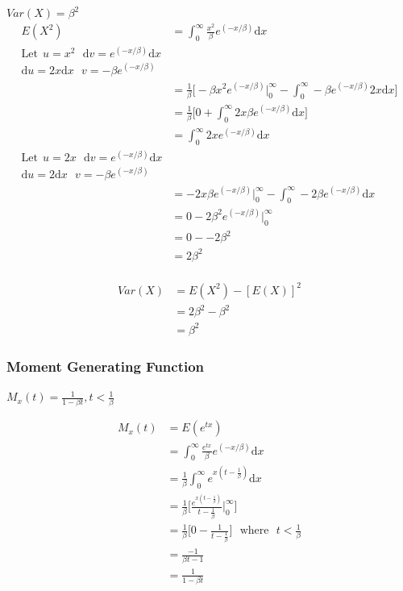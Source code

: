 \documentclass{article}
\begin{document}
$Var(X) = \beta^2$
\begin{align*}
E(X^2) &=  \int_0^\infty \frac{x^2}{\beta}e^{(-x/\beta)} \mathrm{d}x \\
\textrm{Let}\:\: u=x^2   \:\:\:    \mathrm{d}v = e^{(-x/\beta)} \mathrm{d}x \\
 \mathrm{d}u =  2x\mathrm{d}x       \:\:\:        v= - \beta  e^{(-x/\beta)}\\ 
&= \frac{1}{\beta}\bigg[ -\beta x^2  e^{(-x/\beta)} \bigg\vert_0^\infty - \int_0^\infty -\beta  e^{(-x/\beta)} 2x\mathrm{d}x\bigg] \\
&=  \frac{1}{\beta}\bigg[0 + \int_0^\infty 2x \beta e^{(-x/\beta)}\mathrm{d}x\bigg] \\
&=   \int_0^\infty 2x e^{(-x/\beta)}\mathrm{d}x \\
\textrm{Let}\:\: u=2x   \:\:\:    \mathrm{d}v = e^{(-x/\beta)} \mathrm{d}x \\
 \mathrm{d}u =  2\mathrm{d}x       \:\:\:        v= - \beta  e^{(-x/\beta)}\\ 
&= -2x\beta e^{(-x/\beta)}\bigg\vert_0^\infty - \int_0^\infty -2 \beta  e^{(-x/\beta)} \mathrm{d}x \\
&= 0 - 2 \beta^2  e^{(-x/\beta)} \bigg\vert_0^\infty \\
&= 0 - - 2 \beta^2 \\
&=2\beta^2 
\end{align*}\\

\begin{align*}
Var(X) &= E(X^2) - [E(X)]^2\\
&=2\beta^2 - \beta^2\\
&=\beta^2
\end{align*}

\subsubsection*{Moment Generating Function}

$M_{x}(t) = \frac{1}{1-\beta t} , t<\frac{1}{\beta}$

\begin{align*}
M_{x}(t) &= E(e^{tx})\\
&= \int_0^\infty \frac{e^{tx}}{\beta}e^{(-x/\beta)} \mathrm{d}x \\
&=  \frac{1}{\beta} \int_0^\infty e^{x(t-\frac{1}{\beta})} \mathrm{d}x\\
&= \frac{1}{\beta}\bigg[ \frac{ e^{x(t-\frac{1}{\beta})}}{t-\frac{1}{\beta}}\bigg\vert_0^\infty \bigg]\\
&=  \frac{1}{\beta}\bigg[0 - \frac{1}{t-\frac{1}{\beta}}\bigg] \:\:\:\textrm{where}\:\:\: t < \frac{1}{\beta}\\
&= \frac{-1}{\beta t - 1} \\
&= \frac{1}{1-\beta t}
\end{align*}
\end{document}
